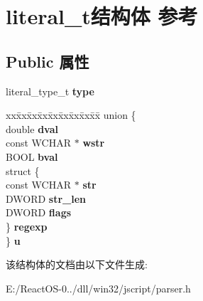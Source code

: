 \hypertarget{structliteral__t}{}\section{literal\+\_\+t结构体 参考}
\label{structliteral__t}
\subsection*{Public 属性}
\begin{DoxyCompactItemize}
\item 
\mbox{\label{structliteral__t_ad7d79062fa757ec01099b80e66047354}} 
literal\+\_\+type\+\_\+t {\bfseries type}
\item 
\mbox{\label{structliteral__t_a65387a8432b3ce7465a75bc061224a8f}} 
\begin{tabbing}
xx\=xx\=xx\=xx\=xx\=xx\=xx\=xx\=xx\=\kill
union \{\\
\>double {\bfseries dval}\\
\>const WCHAR $\ast$ {\bfseries wstr}\\
\>BOOL {\bfseries bval}\\
\>struct \{\\
\>\>const WCHAR $\ast$ {\bfseries str}\\
\>\>DWORD {\bfseries str\_len}\\
\>\>DWORD {\bfseries flags}\\
\>\} {\bfseries regexp}\\
\} {\bfseries u}\\

\end{tabbing}\end{DoxyCompactItemize}


该结构体的文档由以下文件生成\+:\begin{DoxyCompactItemize}
\item 
E\+:/\+React\+O\+S-\/0../dll/win32/jscript/parser.\+h\end{DoxyCompactItemize}
